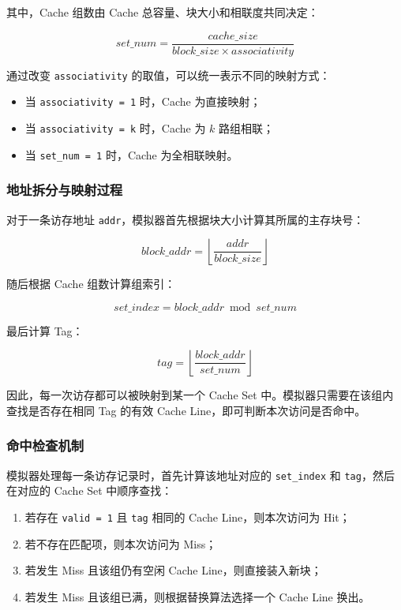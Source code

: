 其中，Cache 组数由 Cache 总容量、块大小和相联度共同决定：

\[
set\_num = \frac{cache\_size}{block\_size \times associativity}
\]

通过改变 \texttt{associativity} 的取值，可以统一表示不同的映射方式：

\begin{itemize}
    \item 当 \texttt{associativity = 1} 时，Cache 为直接映射；
    \item 当 \texttt{associativity = k} 时，Cache 为 $k$ 路组相联；
    \item 当 \texttt{set\_num = 1} 时，Cache 为全相联映射。
\end{itemize}

\subsubsection{地址拆分与映射过程}

对于一条访存地址 \texttt{addr}，模拟器首先根据块大小计算其所属的主存块号：

\[
block\_addr = \left\lfloor \frac{addr}{block\_size} \right\rfloor
\]

随后根据 Cache 组数计算组索引：

\[
set\_index = block\_addr \bmod set\_num
\]

最后计算 Tag：

\[
tag = \left\lfloor \frac{block\_addr}{set\_num} \right\rfloor
\]

因此，每一次访存都可以被映射到某一个 Cache Set 中。模拟器只需要在该组内查找是否存在相同 Tag 的有效 Cache Line，即可判断本次访问是否命中。

\subsubsection{命中检查机制}

模拟器处理每一条访存记录时，首先计算该地址对应的 \texttt{set\_index} 和 \texttt{tag}，然后在对应的 Cache Set 中顺序查找：

\begin{enumerate}
    \item 若存在 \texttt{valid = 1} 且 \texttt{tag} 相同的 Cache Line，则本次访问为 Hit；
    \item 若不存在匹配项，则本次访问为 Miss；
    \item 若发生 Miss 且该组仍有空闲 Cache Line，则直接装入新块；
    \item 若发生 Miss 且该组已满，则根据替换算法选择一个 Cache Line 换出。
\end{enumerate}

